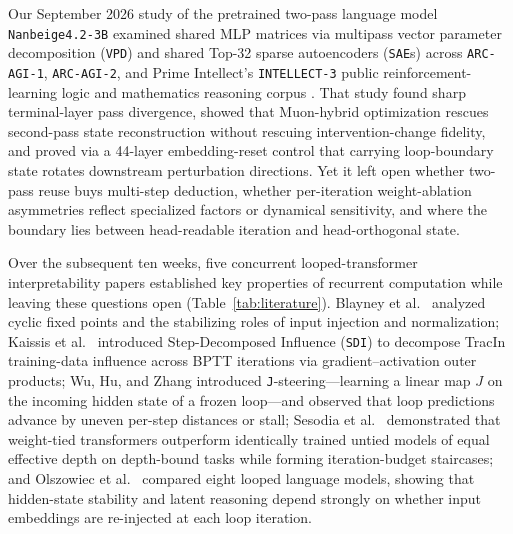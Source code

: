 \documentclass[10pt,letterpaper]{article}
\begin{document}
Our September 2026 study of the pretrained two-pass language model \texttt{Nanbeige4.2-3B} \cite{nanbeige2026model,dugan2026vpd} examined shared MLP matrices via multipass vector parameter decomposition (\texttt{VPD}) \cite{braun2025apd} and shared Top-32 sparse autoencoders (\texttt{SAE}s) \cite{bricken2023monosemanticity,gao2024scaling} across \texttt{ARC-AGI-1}, \texttt{ARC-AGI-2}, and Prime Intellect's \texttt{INTELLECT-3} public reinforcement-learning logic and mathematics reasoning corpus \cite{primeintellect2025intellect3}. That study found sharp terminal-layer pass divergence, showed that Muon-hybrid optimization \cite{jordan2024muon,dugan2026muonsae} rescues second-pass state reconstruction without rescuing intervention-change fidelity, and proved via a 44-layer embedding-reset control that carrying loop-boundary state rotates downstream perturbation directions. Yet it left open whether two-pass reuse buys multi-step deduction, whether per-iteration weight-ablation asymmetries reflect specialized factors or dynamical sensitivity, and where the boundary lies between head-readable iteration and head-orthogonal state.

Over the subsequent ten weeks, five concurrent looped-transformer interpretability papers established key properties of recurrent computation while leaving these questions open (Table~\ref{tab:literature}). Blayney et al.\ \cite{blayney2026mechanistic} analyzed cyclic fixed points and the stabilizing roles of input injection and normalization; Kaissis et al.\ \cite{kaissis2026sdi} introduced Step-Decomposed Influence (\texttt{SDI}) to decompose TracIn training-data influence across BPTT iterations via gradient--activation outer products; Wu, Hu, and Zhang \cite{wu2026shared} introduced \texttt{J}-steering—learning a linear map $J$ on the incoming hidden state of a frozen loop—and observed that loop predictions advance by uneven per-step distances or stall; Sesodia et al.\ \cite{sesodia2026inside} demonstrated that weight-tied transformers outperform identically trained untied models of equal effective depth on depth-bound tasks while forming iteration-budget staircases; and Olszowiec et al.\ \cite{olszowiec2026monitoring} compared eight looped language models, showing that hidden-state stability and latent reasoning depend strongly on whether input embeddings are re-injected at each loop iteration.
\end{document}
